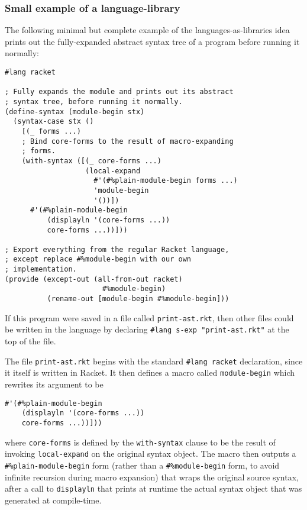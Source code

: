 \documentclass{article}
\begin{document}
\subsubsection{Small example of a language-library}
The following minimal but complete example of the languages-as-libraries idea prints out the fully-expanded abstract syntax tree of a program before running it normally:

\begin{lstlisting}
#lang racket

; Fully expands the module and prints out its abstract
; syntax tree, before running it normally.
(define-syntax (module-begin stx)
  (syntax-case stx ()
    [(_ forms ...)
    ; Bind core-forms to the result of macro-expanding
    ; forms.
    (with-syntax ([(_ core-forms ...)
                   (local-expand
                     #'(#%plain-module-begin forms ...)
                     'module-begin
                     '())])
      #'(#%plain-module-begin
          (displayln '(core-forms ...))
          core-forms ...))]))

; Export everything from the regular Racket language,
; except replace #%module-begin with our own
; implementation.
(provide (except-out (all-from-out racket)
                       #%module-begin)
          (rename-out [module-begin #%module-begin]))
\end{lstlisting}

If this program were saved in a file called \texttt{print-ast.rkt}, then other files could be written in the language by declaring \texttt{\#lang s-exp "print-ast.rkt"} at the top of the file.

The file \texttt{print-ast.rkt} begins with the standard \texttt{\#lang racket} declaration, since it itself is written in Racket. It then defines a macro called \texttt{module-begin} which rewrites its argument to be

\begin{lstlisting}
#'(#%plain-module-begin
    (displayln '(core-forms ...))
    core-forms ...))]))
\end{lstlisting}

\noindent where \texttt{core-forms} is defined by the \texttt{with-syntax} clause to be the result of invoking \texttt{local-expand} on the original syntax object. The macro then outputs a \texttt{\#\%plain-module-begin} form (rather than a \texttt{\#\%module-begin} form, to avoid infinite recursion during macro expansion) that wraps the original source syntax, after a call to \texttt{displayln} that prints at runtime the actual syntax object that was generated at compile-time.
\end{document}
